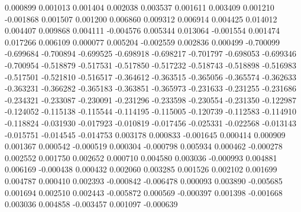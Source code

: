 0.000899
0.001013
0.001404
0.002038
0.003537
0.001611
0.003409
0.001210
-0.001868
0.001507
0.001200
0.006860
0.009312
0.006914
0.004425
0.014012
0.004407
0.009868
0.004111
-0.004576
0.005344
0.013064
-0.001554
0.001474
0.017266
0.006109
0.000077
0.005204
-0.002559
0.002836
0.000499
-0.700099
-0.699684
-0.700894
-0.699525
-0.698918
-0.698217
-0.701797
-0.698053
-0.699346
-0.700954
-0.518879
-0.517531
-0.517850
-0.517232
-0.518743
-0.518898
-0.516983
-0.517501
-0.521810
-0.516517
-0.364612
-0.363515
-0.365056
-0.365574
-0.362633
-0.363231
-0.366282
-0.365183
-0.363851
-0.365973
-0.231633
-0.231255
-0.231686
-0.234321
-0.233087
-0.230091
-0.231296
-0.233598
-0.230554
-0.231350
-0.122987
-0.124052
-0.115138
-0.115544
-0.114195
-0.115005
-0.120739
-0.112583
-0.114910
-0.118824
-0.031930
-0.017923
-0.010819
-0.017456
-0.025331
-0.022568
-0.013143
-0.015751
-0.014545
-0.014753
0.003178
0.000833
-0.001645
0.000414
0.000909
0.001367
0.000542
-0.000519
0.000304
-0.000798
0.005934
0.000462
-0.000278
0.002552
0.001750
0.002652
0.000710
0.004580
0.003036
-0.000993
0.004881
0.006169
-0.000438
0.000432
0.002060
0.003285
0.001526
0.002102
0.001699
0.004787
0.000410
0.002393
-0.000842
-0.006478
0.000093
0.003890
-0.005685
0.001694
0.002510
0.002443
-0.005872
0.000569
-0.000397
0.001398
-0.001668
0.003036
0.004858
-0.003457
0.001097
-0.000639
